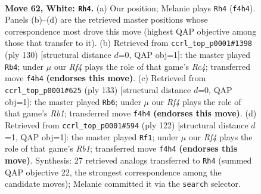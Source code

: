 \documentclass[11pt]{article}
\begin{document}
\clearpage

\begin{figure}[p]\centering
\begin{subfigure}{0.46\textwidth}\centering
\resizebox{\linewidth}{!}{%
\newchessgame
\chessboard[
  setfen={4k3/8/2r5/8/5R2/8/6K1/8 w - - 4 62},
  showmover=false,
  pgfstyle=straightmove, color=movearrow, markmove={f4-h4}
]}
\caption{}
\end{subfigure}\hfill
\begin{subfigure}{0.46\textwidth}\centering
\resizebox{\linewidth}{!}{%
\newchessgame
\chessboard[
  setfen={3k4/8/7r/8/2R5/8/8/3K4 w - - 9 66},
  showmover=false,
  pgfstyle=straightmove, color=movearrow, markmove={c4-b4}
]}
\caption{}
\end{subfigure}
\\[4pt]
\begin{subfigure}{0.46\textwidth}\centering
\resizebox{\linewidth}{!}{%
\newchessgame
\chessboard[
  setfen={1r6/3k4/8/8/8/8/6R1/2K5 b - - 35 67},
  showmover=false,
  pgfstyle=straightmove, color=movearrow, markmove={b8-b6}
]}
\caption{}
\end{subfigure}\hfill
\begin{subfigure}{0.46\textwidth}\centering
\resizebox{\linewidth}{!}{%
\newchessgame
\chessboard[
  setfen={2k5/8/4K3/r7/8/8/8/1R6 w - - 4 62},
  showmover=false,
  pgfstyle=straightmove, color=movearrow, markmove={b1-f1}
]}
\caption{}
\end{subfigure}
\caption{\textbf{Move 62, White: \texttt{Rh4}.} (a) Our position; Melanie plays \texttt{Rh4} (\texttt{f4h4}). Panels (b)--(d) are the retrieved master positions whose correspondence most drove this move (highest QAP objective among those that transfer to it). (b) Retrieved from \texttt{ccrl\_top\_p0001\#1398} (ply 130) [structural distance $d$=0, QAP obj=1]: the master played \texttt{Rb4}; under $\mu$ our \emph{Rf4} plays the role of that game's \emph{Rc4}; transferred move \texttt{f4h4} \textbf{(endorses this move)}. (c) Retrieved from \texttt{ccrl\_top\_p0001\#625} (ply 133) [structural distance $d$=0, QAP obj=1]: the master played \texttt{Rb6}; under $\mu$ our \emph{Rf4} plays the role of that game's \emph{Rb1}; transferred move \texttt{f4h4} \textbf{(endorses this move)}. (d) Retrieved from \texttt{ccrl\_top\_p0001\#594} (ply 122) [structural distance $d$=1, QAP obj=1]: the master played \texttt{Rf1}; under $\mu$ our \emph{Rf4} plays the role of that game's \emph{Rb1}; transferred move \texttt{f4h4} \textbf{(endorses this move)}. Synthesis: 27 retrieved analogs transferred to \texttt{Rh4} (summed QAP objective 22, the strongest correspondence among the candidate moves); Melanie committed it via the \texttt{search} selector.}
\label{fig:thought-m122}
\end{figure}
\end{document}

